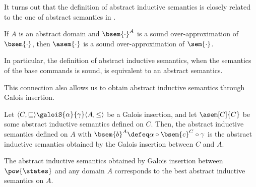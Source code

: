 It turns out that the definition of abstract inductive semantics is closely 
related to the one of abstract semantics in \cite{Cousot77}.

\begin{theorem}
  \label{thm:sound-ai}
  If $A$ is an abstract domain and $\bsem{\cdot}^A$ is a sound 
  over-approximation of $\bsem{\cdot}$, then $\asem{\cdot}$ is a sound 
  over-approximation of $\sem{\cdot}$.
\end{theorem}

In particular, the definition of abstract inductive semantics, when the 
semantics of the base commands is sound, is equivalent to an abstract semantics.

This connection also allows us to obtain abstract inductive semantics through 
Galois insertion.

\begin{definition}
  \label{def:aisgi}
  Let $\langle C, \sqsubseteq \rangle \galoiS{\alpha}{\gamma} \langle A, \leq 
  \rangle$ be a Galois insertion, and let $\asem[C]{C}$ be some abstract 
  inductive semantics defined on $C$. Then, the abstract inductive semantics 
  defined on $A$ with $\bsem{b}^A \defeq \alpha \circ \bsem{c}^C \circ \gamma$ is the 
  abstract inductive semantics obtained by the Galois insertion between $C$ and $A$.
\end{definition}

The abstract inductive semantics obtained by Galois insertion between 
$\pow{\states}$ and any domain $A$ corresponds to the best abstract inductive 
semantics on $A$.
